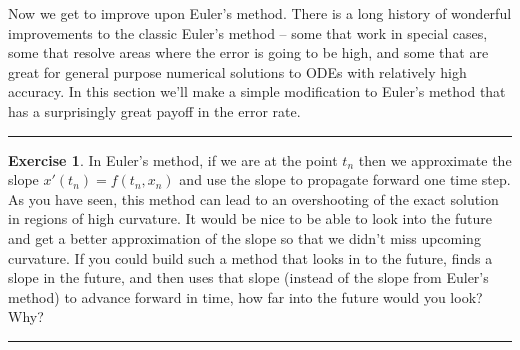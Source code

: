 \documentclass[
]{book}
\theoremstyle{definition}
\theoremstyle{definition}
\theoremstyle{definition}
\newtheorem{exercise}{Exercise}[chapter]
\theoremstyle{remark}
\begin{document}
Now we get to improve upon Euler's method. There is a long history of wonderful improvements to the classic Euler's method -- some that work in special cases, some that resolve areas where the error is going to be high, and some that are great for general purpose numerical solutions to ODEs with relatively high accuracy. In this section we'll make a simple modification to Euler's method that has a surprisingly great payoff in the error rate.

\begin{center}\rule{0.5\linewidth}{0.5pt}\end{center}

\begin{exercise}
\protect\hypertarget{exr:unnamed-chunk-439}{}{\label{exr:unnamed-chunk-439} }In Euler's method, if we are at the point \(t_n\) then we approximate the slope \(x'(t_n) = f(t_n,x_n)\) and use the slope to propagate forward one time step. As you have seen, this method can lead to an overshooting of the exact solution in regions of high curvature. It would be nice to be able to look into the future and get a better approximation of the slope so that we didn't miss upcoming curvature. If you could build such a method that looks in to the future, finds a slope in the future, and then uses that slope (instead of the slope from Euler's method) to advance forward in time, how far into the future would you look? Why?
\end{exercise}

\begin{center}\rule{0.5\linewidth}{0.5pt}\end{center}
\end{document}

